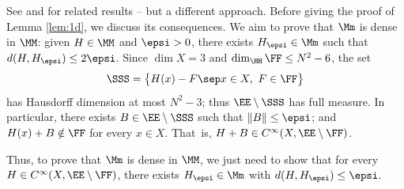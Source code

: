 See \cite[\S2]{AS78} and \cite[\S3]{DE99} for related results -- but a different approach.
Before giving the proof of Lemma \ref{lem:1d}, we discuss its consequences. We aim to prove that $\Mm$ is dense in $\MM$: given $H \in \MM$ and $\epsi > 0$, there exists $H_\epsi \in \Mm$ such that $d(H,H_\epsi) \leq 2\epsi$. Since $\dim X = 3$ and $\dim_\HH \FF \leq N^2-6$, the set
\begin{equation*}
\SSS = \bigl\{ H(x) - F \sep x \in X, \ F \in \FF\bigr\}
\end{equation*}
has Hausdorff dimension at most $N^2-3$; thus $\EE \setminus \SSS$ has full measure. In particular, there exists $B \in \EE \setminus \SSS$ such that $\| B \| \leq \epsi$; and $H(x) + B \notin \FF$ for every $x \in X$. That~is, $H+B \in C^\infty(X,\EE\setminus \FF)$.

Thus, to prove that $\Mm$ is dense in $\MM$, we just need to show that for every $H \in C^\infty(X,\EE\setminus\FF)$, there exists $H_\epsi \in \Mm$ with $d(H,H_\epsi) \leq \epsi$.


